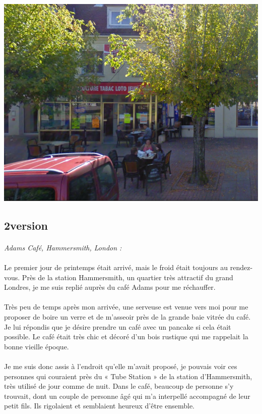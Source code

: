 \begin{center}
\includegraphics[scale=0.5]{BarArcis.PNG}
\end{center}

\subsection{2\ieme version}
\paragraph{}
\emph{Adams Café, Hammersmith, London :}

\paragraph{}
Le premier jour de printemps était arrivé, mais le froid était toujours au
rendez-vous. Près de la station Hammersmith, un quartier très attractif du
grand Londres, je me suis replié auprès du café Adams pour me réchauffer.

\paragraph{}
Très peu de temps après mon arrivée, une serveuse est venue vers moi pour me
proposer de boire un verre et de m’asseoir près de la grande baie vitrée du
café. Je lui répondis que je désire prendre un café avec un pancake si cela
était possible. Le café était très chic et décoré d’un bois rustique qui me
rappelait la bonne vieille époque.

\paragraph{}
Je me suis donc assis à l’endroit qu’elle m’avait proposé, je pouvais voir ces
personnes qui couraient près du « Tube Station » de la station d’Hammersmith,
très utilisé de jour comme de nuit. Dans le café, beaucoup de personne s’y
trouvait, dont un couple de personne âgé qui m’a interpellé accompagné de leur
petit fils. Ils rigolaient et semblaient heureux d’être ensemble.

